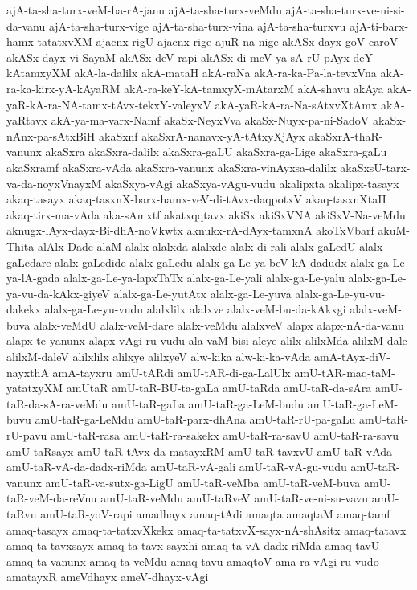 {ajA-ta-sha-turx-veM-ba-rA-janu
ajA-ta-sha-turx-veMdu
ajA-ta-sha-turx-ve-ni-si-da-vanu
ajA-ta-sha-turx-vige
ajA-ta-sha-turx-vina
ajA-ta-sha-turxvu
ajA-ti-barx-hamx-tatatxvXM
ajacnx-rigU
ajacnx-rige
ajuR-na-nige
akASx-dayx-goV-caroV
akASx-dayx-vi-SayaM
akASx-deV-rapi
akASx-di-meV-ya-sA-rU-pAyx-deY-kAtamxyXM
akA-la-dalilx
akA-mataH
akA-raNa
akA-ra-ka-Pa-la-tevxVna
akA-ra-ka-kirx-yA-kAyaRM
akA-ra-keY-kA-tamxyX-mAtarxM
akA-shavu
akAya
akA-yaR-kA-ra-NA-tamx-tAvx-tekxY-valeyxV
akA-yaR-kA-ra-Na-sAtxvXtAmx
akA-yaRtavx
akA-ya-ma-varx-Namf
akaSx-NeyxVva
akaSx-Nuyx-pa-ni-SadoV
akaSx-nAnx-pa-sAtxBiH
akaSxnf
akaSxrA-nanavx-yA-tAtxyXjAyx
akaSxrA-thaR-vanunx
akaSxra
akaSxra-dalilx
akaSxra-gaLU
akaSxra-ga-Lige
akaSxra-gaLu
akaSxramf
akaSxra-vAda
akaSxra-vanunx
akaSxra-vinAyxsa-dalilx
akaSxsU-tarx-va-da-noyxVnayxM
akaSxya-vAgi
akaSxya-vAgu-vudu
akalipxta
akalipx-tasayx
akaq-tasayx
akaq-tasxnX-barx-hamx-veV-di-tAvx-daqpotxV
akaq-tasxnXtaH
akaq-tirx-ma-vAda
aka-sAmxtf
akatxqqtavx
akiSx
akiSxVNA
akiSxV-Na-veMdu
aknugx-lAyx-dayx-Bi-dhA-noVkwtx
aknukx-rA-dAyx-tamxnA
akoTxVbarf
akuM-Thita
alAlx-Dade
alaM
alalx
alalxda
alalxde
alalx-di-rali
alalx-gaLedU
alalx-gaLedare
alalx-gaLedide
alalx-gaLedu
alalx-ga-Le-ya-beV-kA-dadudx
alalx-ga-Le-ya-lA-gada
alalx-ga-Le-ya-lapxTaTx
alalx-ga-Le-yali
alalx-ga-Le-yalu
alalx-ga-Le-ya-vu-da-kAkx-giyeV
alalx-ga-Le-yutAtx
alalx-ga-Le-yuva
alalx-ga-Le-yu-vu-dakekx
alalx-ga-Le-yu-vudu
alalxlilx
alalxve
alalx-veM-bu-da-kAkxgi
alalx-veM-buva
alalx-veMdU
alalx-veM-dare
alalx-veMdu
alalxveV
alapx
alapx-nA-da-vanu
alapx-te-yanunx
alapx-vAgi-ru-vudu
ala-vaM-bisi
aleye
alilx
alilxMda
alilxM-dale
alilxM-daleV
alilxlilx
alilxye
alilxyeV
alw-kika
alw-ki-ka-vAda
amA-tAyx-diV-nayxthA
amA-tayxru
amU-tARdi
amU-tAR-di-ga-LalUlx
amU-tAR-maq-taM-yatatxyXM
amUtaR
amU-taR-BU-ta-gaLa
amU-taRda
amU-taR-da-sAra
amU-taR-da-sA-ra-veMdu
amU-taR-gaLa
amU-taR-ga-LeM-budu
amU-taR-ga-LeM-buvu
amU-taR-ga-LeMdu
amU-taR-parx-dhAna
amU-taR-rU-pa-gaLu
amU-taR-rU-pavu
amU-taR-rasa
amU-taR-ra-sakekx
amU-taR-ra-savU
amU-taR-ra-savu
amU-taRsayx
amU-taR-tAvx-da-matayxRM
amU-taR-tavxvU
amU-taR-vAda
amU-taR-vA-da-dadx-riMda
amU-taR-vA-gali
amU-taR-vA-gu-vudu
amU-taR-vanunx
amU-taR-va-sutx-ga-LigU
amU-taR-veMba
amU-taR-veM-buva
amU-taR-veM-da-reVnu
amU-taR-veMdu
amU-taRveV
amU-taR-ve-ni-su-vavu
amU-taRvu
amU-taR-yoV-rapi
amadhayx
amaq-tAdi
amaqta
amaqtaM
amaq-tamf
amaq-tasayx
amaq-ta-tatxvXkekx
amaq-ta-tatxvX-sayx-nA-shAsitx
amaq-tatavx
amaq-ta-tavxsayx
amaq-ta-tavx-sayxhi
amaq-ta-vA-dadx-riMda
amaq-tavU
amaq-ta-vanunx
amaq-ta-veMdu
amaq-tavu
amaqtoV
ama-ra-vAgi-ru-vudo
amatayxR
ameVdhayx
ameV-dhayx-vAgi
}
